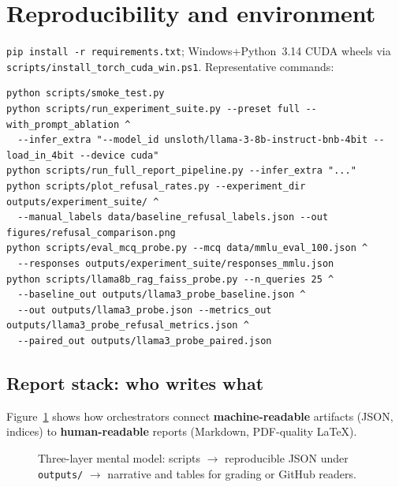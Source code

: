 \documentclass[11pt,a4paper]{article}
\begin{document}
\section[Reproducibility]{Reproducibility and environment}

\mbox{\texttt{pip install -r requirements.txt}}; Windows+Python~3.14 CUDA wheels via \texttt{scripts/install\_torch\_cuda\_win.ps1}.
Representative commands:
\begin{lstlisting}
python scripts/smoke_test.py
python scripts/run_experiment_suite.py --preset full --with_prompt_ablation ^
  --infer_extra "--model_id unsloth/llama-3-8b-instruct-bnb-4bit --load_in_4bit --device cuda"
python scripts/run_full_report_pipeline.py --infer_extra "..."
python scripts/plot_refusal_rates.py --experiment_dir outputs/experiment_suite/ ^
  --manual_labels data/baseline_refusal_labels.json --out figures/refusal_comparison.png
python scripts/eval_mcq_probe.py --mcq data/mmlu_eval_100.json ^
  --responses outputs/experiment_suite/responses_mmlu.json
python scripts/llama8b_rag_faiss_probe.py --n_queries 25 ^
  --baseline_out outputs/llama3_probe_baseline.json ^
  --out outputs/llama3_probe.json --metrics_out outputs/llama3_probe_refusal_metrics.json ^
  --paired_out outputs/llama3_probe_paired.json
\end{lstlisting}

\subsection{Report stack: who writes what}
\label{sec:report-map}

Figure~\ref{fig:report-layers} shows how orchestrators connect \textbf{machine-readable} artifacts (JSON, indices) to \textbf{human-readable} reports (Markdown, PDF-quality \LaTeX).

\begin{figure}[ht]
\centering
{}
\caption{Three-layer mental model: scripts $\rightarrow$ reproducible JSON under \texttt{outputs/} $\rightarrow$ narrative and tables for grading or GitHub readers.}
\label{fig:report-layers}
\end{figure}
\end{document}
